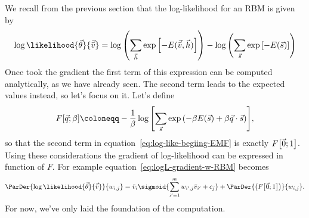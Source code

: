 We recall from the previous section that the log-likelihood for an RBM is given by
\begin{equation} \label{eq:log-like-begiing-EMF}
  \log\likelihood{\vec{\theta}}{\vec{\bar{v}}}
    = \log\left(\sum_{\vec{h}} \exp\left[-E(\vec{\bar{v}},\vec{h})\right]\right)
      - \log\left(\sums \exp\left[-E(\vec{s})\right]\right)
\end{equation}
Once took the gradient the first term of this expression can be computed analytically,
as we have already seen. The second term leads to the expected values instead, so let's
focus on it. Let's define
\begin{equation} \label{eq:def-F}
  \FEn{\vec{q}}{\beta} \coloneqq - \frac{1}{\beta}
                           \log{\left[\sums \exp{\left(-\beta E(\vec{s}) + \beta \vec{q}\cdot\vec{s}\right)}\right]},
\end{equation}
so that the second term in equation~\eqref{eq:log-like-begiing-EMF} is exactly
\(F{\left[\vec{0};1\right]}\).
Using these considerations the gradient of log-likelihood can be expressed in function of
\(F\). For example equation~\eqref{eq:logL-gradient-w-RBM} becomes
\[
  \ParDer{\log\likelihood{\vec{\theta}}{\vec{\bar{v}}}}{w_{i,j}} =
    \bar{v}_i \sigmoid{\sum_{i'=1}^m w_{i',j}\bar{v}_{i'}+c_j}
    +\ParDer{\left(\FEn{\vec{0}}{1}\right)}{w_{i,j}}.
\]
For now, we've only laid the foundation of the computation.


